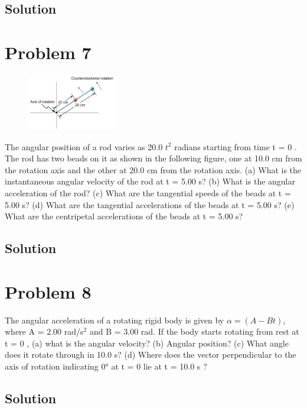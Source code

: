 \documentclass[12pt]{article}
\begin{document}
\subsection*{Solution}


\pagebreak
\section*{Problem 7}
\begin{figure}
    \vspace{-30pt}
    \includegraphics[width=0.35\textwidth]{graph_7.png} 
\end{figure}
The angular position of a rod varies as 20.0 $t^2$ radians starting from time t = 0 . The rod has
two beads on it as shown in the following figure, one at 10.0 cm from the rotation axis and the
other at 20.0 cm from the rotation axis. (a) What is the instantaneous angular velocity of the rod
at t = 5.00 s? (b) What is the angular acceleration of the rod? (c) What are the tangential speeds
of the beads at t = 5.00 s? (d) What are the tangential accelerations of the beads at t = 5.00 s? (e)
What are the centripetal accelerations of the beads at t = 5.00 s?

\subsection*{Solution}


\pagebreak
\section*{Problem 8}
The angular acceleration of a rotating rigid body is given by $\alpha = (A - Bt)$, where A =
2.00 rad/s$^2$ and B = 3.00 rad. If the body starts rotating from rest at t = 0 , (a) what is the angular
velocity? (b) Angular position? (c) What angle does it rotate through in 10.0 s? (d) Where does
the vector perpendicular to the axis of rotation indicating 0\unit{\degree} at t = 0 lie at t = 10.0 s ?

\subsection*{Solution}
\end{document}
